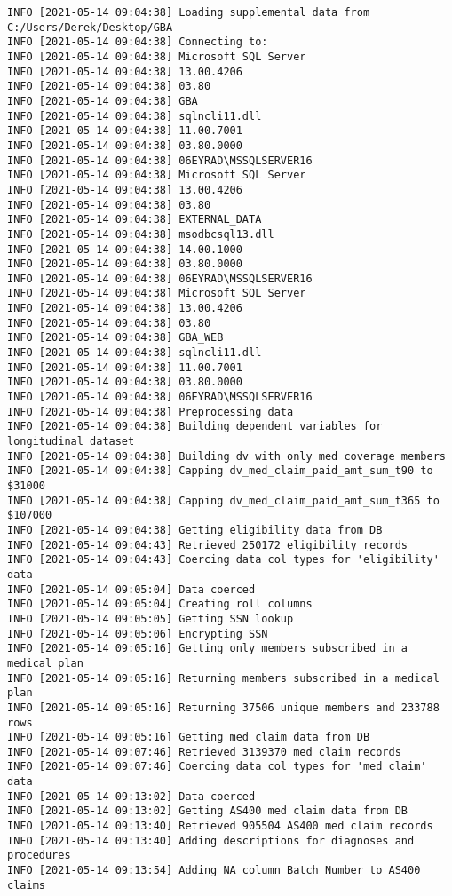 \documentclass[
]{book}
\begin{document}
\begin{verbatim}
INFO [2021-05-14 09:04:38] Loading supplemental data from C:/Users/Derek/Desktop/GBA
INFO [2021-05-14 09:04:38] Connecting to:
INFO [2021-05-14 09:04:38] Microsoft SQL Server
INFO [2021-05-14 09:04:38] 13.00.4206
INFO [2021-05-14 09:04:38] 03.80
INFO [2021-05-14 09:04:38] GBA
INFO [2021-05-14 09:04:38] sqlncli11.dll
INFO [2021-05-14 09:04:38] 11.00.7001
INFO [2021-05-14 09:04:38] 03.80.0000
INFO [2021-05-14 09:04:38] 06EYRAD\MSSQLSERVER16
INFO [2021-05-14 09:04:38] Microsoft SQL Server
INFO [2021-05-14 09:04:38] 13.00.4206
INFO [2021-05-14 09:04:38] 03.80
INFO [2021-05-14 09:04:38] EXTERNAL_DATA
INFO [2021-05-14 09:04:38] msodbcsql13.dll
INFO [2021-05-14 09:04:38] 14.00.1000
INFO [2021-05-14 09:04:38] 03.80.0000
INFO [2021-05-14 09:04:38] 06EYRAD\MSSQLSERVER16
INFO [2021-05-14 09:04:38] Microsoft SQL Server
INFO [2021-05-14 09:04:38] 13.00.4206
INFO [2021-05-14 09:04:38] 03.80
INFO [2021-05-14 09:04:38] GBA_WEB
INFO [2021-05-14 09:04:38] sqlncli11.dll
INFO [2021-05-14 09:04:38] 11.00.7001
INFO [2021-05-14 09:04:38] 03.80.0000
INFO [2021-05-14 09:04:38] 06EYRAD\MSSQLSERVER16
INFO [2021-05-14 09:04:38] Preprocessing data
INFO [2021-05-14 09:04:38] Building dependent variables for longitudinal dataset
INFO [2021-05-14 09:04:38] Building dv with only med coverage members
INFO [2021-05-14 09:04:38] Capping dv_med_claim_paid_amt_sum_t90 to $31000
INFO [2021-05-14 09:04:38] Capping dv_med_claim_paid_amt_sum_t365 to $107000
INFO [2021-05-14 09:04:38] Getting eligibility data from DB
INFO [2021-05-14 09:04:43] Retrieved 250172 eligibility records
INFO [2021-05-14 09:04:43] Coercing data col types for 'eligibility' data
INFO [2021-05-14 09:05:04] Data coerced
INFO [2021-05-14 09:05:04] Creating roll columns
INFO [2021-05-14 09:05:05] Getting SSN lookup
INFO [2021-05-14 09:05:06] Encrypting SSN
INFO [2021-05-14 09:05:16] Getting only members subscribed in a medical plan
INFO [2021-05-14 09:05:16] Returning members subscribed in a medical plan
INFO [2021-05-14 09:05:16] Returning 37506 unique members and 233788 rows
INFO [2021-05-14 09:05:16] Getting med claim data from DB
INFO [2021-05-14 09:07:46] Retrieved 3139370 med claim records
INFO [2021-05-14 09:07:46] Coercing data col types for 'med claim' data
INFO [2021-05-14 09:13:02] Data coerced
INFO [2021-05-14 09:13:02] Getting AS400 med claim data from DB
INFO [2021-05-14 09:13:40] Retrieved 905504 AS400 med claim records
INFO [2021-05-14 09:13:40] Adding descriptions for diagnoses and procedures
INFO [2021-05-14 09:13:54] Adding NA column Batch_Number to AS400 claims

\end{verbatim}
\end{document}
